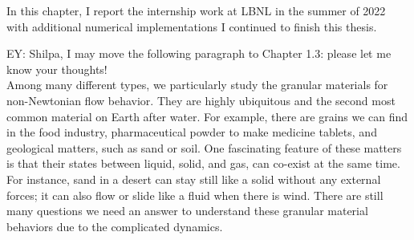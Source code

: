 \par
In this chapter, I report the internship work at LBNL in the summer of 2022 with additional numerical implementations I continued to finish this thesis.

\par
{\color{blue}EY: Shilpa, I may move the following paragraph to Chapter 1.3: please let me know your thoughts!}
\\
Among many different types, we particularly study the granular materials for non-Newtonian flow behavior. They are highly ubiquitous and the second most common material on Earth after water. For example, there are grains we can find in the food industry, pharmaceutical powder to make medicine tablets, and geological matters, such as sand or soil.
One fascinating feature of these matters is that their states between liquid, solid, and gas, can co-exist at the same time. For instance, sand in a desert can stay still like a solid without any external forces; it can also flow or slide like a fluid when there is wind.
There are still many questions we need an answer to understand these granular material behaviors due to the complicated dynamics.



